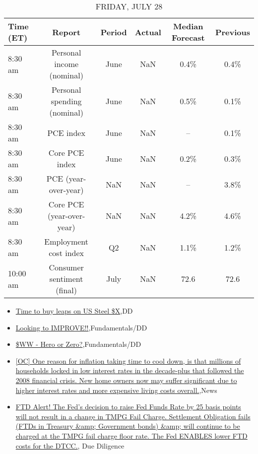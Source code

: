 \documentclass{article}%
\begin{document}
\begin{table}[htbp]%
\caption{FRIDAY, JULY 28}%
\centering%
\begin{adjustbox}{width=1\textwidth}%
\begin{tabular}{lccccc}
\toprule
Time (ET) &                      Report & Period & Actual & Median Forecast & Previous \\
\midrule
  8:30 am &   Personal income (nominal) &   June &    NaN &            0.4\% &     0.4\% \\
  8:30 am & Personal spending (nominal) &   June &    NaN &            0.5\% &     0.1\% \\
  8:30 am &                   PCE index &   June &    NaN &              -- &     0.1\% \\
  8:30 am &              Core PCE index &   June &    NaN &            0.2\% &     0.3\% \\
  8:30 am &        PCE (year-over-year) &    NaN &    NaN &              -- &     3.8\% \\
  8:30 am &   Core PCE (year-over-year) &    NaN &    NaN &            4.2\% &     4.6\% \\
  8:30 am &       Employment cost index &     Q2 &    NaN &            1.1\% &     1.2\% \\
 10:00 am &  Consumer sentiment (final) &   July &    NaN &            72.6 &     72.6 \\
\bottomrule
\end{tabular}
%
\end{adjustbox}%
\end{table}

%
\begin{itemize}%
\item%
\href{https://reddit.com/r/wallstreetbets/comments/15b0isr/time\_to\_buy\_leaps\_on\_us\_steel\_x/}{Time to buy leaps on US Steel \$X},DD%
\item%
\href{https://reddit.com/r/StockMarket/comments/15adxua/looking\_to\_improve/}{Looking to IMPROVE!!},Fundamentals/DD%
\item%
\href{https://reddit.com/r/StockMarket/comments/15ad71i/ww\_hero\_or\_zero/}{\$WW - Hero or Zero?},Fundamentals/DD%
\item%
\href{https://reddit.com/r/Economics/comments/15aud3z/oc\_one\_reason\_for\_inflation\_taking\_time\_to\_cool/}{[OC] One reason for inflation taking time to cool down, is that millions of households locked in low interest rates in the decade-plus that followed the 2008 financial crisis. New home owners now may suffer significant due to higher interest rates and more expensive living costs overall.},News%
\item%
\href{https://reddit.com/r/Superstonk/comments/15b0vg1/ftd\_alert\_the\_feds\_decision\_to\_raise\_fed\_funds/}{FTD Alert! The Fed's decision to raise Fed Funds Rate by 25 basis points will not result in a change in TMPG Fail Charge. Settlement Obligation fails (FTDs in Treasury \&amp; Government bonds) \&amp; will continue to be charged at the TMPG fail charge floor rate. The Fed ENABLES lower FTD costs for the DTCC.}, Due Diligence%
\end{itemize}%
\end{document}
